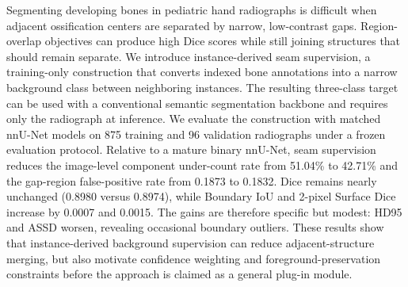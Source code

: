 Segmenting developing bones in pediatric hand radiographs is difficult when adjacent ossification centers are separated by narrow, low-contrast gaps. Region-overlap objectives can produce high Dice scores while still joining structures that should remain separate. We introduce instance-derived seam supervision, a training-only construction that converts indexed bone annotations into a narrow background class between neighboring instances. The resulting three-class target can be used with a conventional semantic segmentation backbone and requires only the radiograph at inference. We evaluate the construction with matched nnU-Net models on 875 training and 96 validation radiographs under a frozen evaluation protocol. Relative to a mature binary nnU-Net, seam supervision reduces the image-level component under-count rate from 51.04\% to 42.71\% and the gap-region false-positive rate from 0.1873 to 0.1832. Dice remains nearly unchanged (0.8980 versus 0.8974), while Boundary IoU and 2-pixel Surface Dice increase by 0.0007 and 0.0015. The gains are therefore specific but modest: HD95 and ASSD worsen, revealing occasional boundary outliers. These results show that instance-derived background supervision can reduce adjacent-structure merging, but also motivate confidence weighting and foreground-preservation constraints before the approach is claimed as a general plug-in module.
